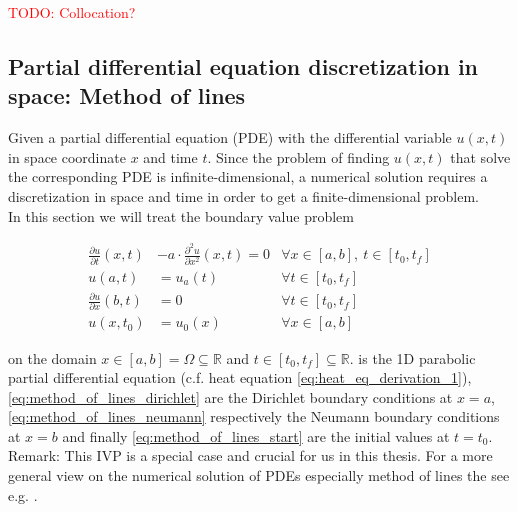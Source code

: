 \documentclass{scrartcl}[12pt, halfparskip]
\numberwithin{equation}{section}
\numberwithin{figure}{section}
\numberwithin{table}{section}
\newcommand{\todo}[1]{\textcolor{red}{TODO: #1}}
\begin{document}
\todo{Collocation?}





\subsection{Partial differential equation discretization in space: Method of lines}
\label{sec:pde_discretization}


Given a partial differential equation (PDE) with the differential variable $u(x,t)$ in space coordinate $x$ and time $t$. Since the problem of finding $u(x,t)$ that solve the corresponding PDE is infinite-dimensional, a numerical solution requires a discretization in space and time in order to get a finite-dimensional problem. \\
In this section we will treat the boundary value problem

\begin{subequations}
	\begin{align}
	\frac{\partial u}{\partial t}(x,t) & - a \cdot \frac{\partial^2 u}{\partial x^2}(x,t) = 0 & \forall x \in [a,b], \ t \in [t_0,t_f] \label{eq:method_of_lines_pde} \\
	u(a,t) & = u_a(t)  & \forall t \in [t_0,t_f] \label{eq:method_of_lines_dirichlet} \\
	\frac{\partial u}{\partial x}(b,t) & = 0  & \forall t \in [t_0,t_f] \label{eq:method_of_lines_neumann}  \\
	u(x,t_0) & = u_0(x) & \forall x \in [a,b] \label{eq:method_of_lines_start}
	\end{align}
\end{subequations}

on the domain $x \in [a,b] = \Omega \subseteq \mathbb{R}$ and $t \in [t_0,t_f] \subseteq \mathbb{R}$.  is the 1D parabolic partial differential equation (c.f. heat equation \eqref{eq:heat_eq_derivation_1}), \cref{eq:method_of_lines_dirichlet} are the Dirichlet boundary conditions at $x=a$, \cref{eq:method_of_lines_neumann} respectively the Neumann boundary conditions at $x=b$ and finally \cref{eq:method_of_lines_start} are the initial values at ${t=t_0}$. \\
Remark: This IVP is a special case and crucial for us in this thesis. For a more general view on the numerical solution of PDEs especially method of lines the see e.g. \cite{pde_buch_solin}. \\
\end{document}
